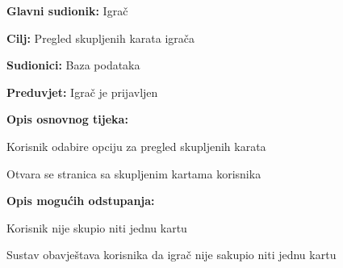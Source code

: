 					\noindent {}
					\begin{packed_item}
						
						\item \textbf{Glavni sudionik: }Igrač
						\item  \textbf{Cilj:} Pregled skupljenih karata igrača
						\item  \textbf{Sudionici:} Baza podataka
						\item  \textbf{Preduvjet:} Igrač je prijavljen
						\item  \textbf{Opis osnovnog tijeka:}
						
						\item[] \begin{packed_enum}
							
							\item Korisnik odabire opciju za pregled skupljenih karata
							\item Otvara se stranica sa skupljenim kartama korisnika
						\end{packed_enum}
						
						\item  \textbf{Opis mogućih odstupanja:}
						
						\item[] \begin{packed_item}
							
							\item Korisnik nije skupio niti jednu kartu
							\item[] \begin{packed_enum}
								
								\item Sustav obavještava korisnika da igrač nije sakupio niti jednu kartu			
							\end{packed_enum}
						\end{packed_item}
					\end{packed_item}
				
